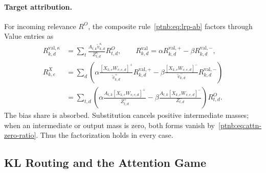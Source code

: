 \paragraph{Target attribution.}
For incoming relevance $R^O$, the composite rule~\eqref{ptnb:eq:lrp-ab} factors through Value entries as
\begin{align}
    R^{\mathrm{val},\kappa}_{k,d}
      &=\sum_t\frac{A_{t,k}\tilde v_{k,d}^\kappa}{Z_{t,d}^\kappa}R^O_{t,d},
    \qquad R^{\mathrm{val}}_{k,d}
      =\alpha R^{\mathrm{val},+}_{k,d}-\beta R^{\mathrm{val},-}_{k,d},
      \label{ptnb:eq:attn-target-rule}\\
    R^X_{k,e}&=\sum_d\left(
       \alpha\frac{[X_{k,e}W_{v,e,d}]^+}{\tilde v_{k,d}^+}R^{\mathrm{val},+}_{k,d}
       -\beta\frac{[X_{k,e}W_{v,e,d}]^-}{\tilde v_{k,d}^-}R^{\mathrm{val},-}_{k,d}
       \right)\label{ptnb:eq:attn-target-input-via-V}\\
      &=\sum_{t,d}\left(
       \alpha\frac{A_{t,k}[X_{k,e}W_{v,e,d}]^+}{Z_{t,d}^+}
       -\beta\frac{A_{t,k}[X_{k,e}W_{v,e,d}]^-}{Z_{t,d}^-}
       \right)R^O_{t,d}.\label{ptnb:eq:attn-target-input}
\end{align}
The bias share is absorbed. Substitution cancels positive intermediate masses; when an intermediate or output mass is zero, both forms vanish by~\eqref{ptnb:eq:attn-zero-ratio}. Thus the factorization holds in every case.

\subsection{KL Routing and the Attention Game}\label{ptnb:app:kl-legendre-fenchel}

